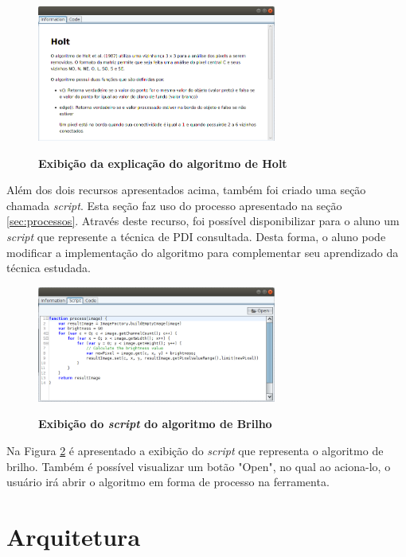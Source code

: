 \documentclass[
	12pt,				%
	oneside,			%
	a4paper,			%
	english,			%
	french,				%
	spanish,			%
	brazil,				%
	]{abntex2}
\begin{document}
\begin{figure}[ht]
\centering
\caption{\textbf{Exibição da explicação do algoritmo de Holt}}
\includegraphics[width=0.7\textwidth]{imagens/visnode_information.png}
\sourceAuthor
\label{fig:visnodeInformation}
\end{figure}

Além dos dois recursos apresentados acima, também foi criado uma seção chamada \textit{script}. Esta seção faz uso do processo apresentado na seção \ref{sec:processos}. Através deste recurso, foi possível disponibilizar para o aluno um \textit{script} que represente a técnica de PDI consultada. Desta forma, o aluno pode modificar a implementação do algoritmo para complementar seu aprendizado da técnica estudada.

\begin{figure}[ht]
\centering
\caption{\textbf{Exibição do \textit{script} do algoritmo de Brilho}}
\includegraphics[width=0.7\textwidth]{imagens/visnode_script.png}
\sourceAuthor
\label{fig:visnodeScript}
\end{figure}

Na Figura \ref{fig:visnodeScript} é apresentado a exibição do \textit{script} que representa o algoritmo de brilho. Também é possível visualizar um botão "Open", no qual ao aciona-lo, o usuário irá abrir o algoritmo em forma de processo na ferramenta.

\section{Arquitetura}
\end{document}
